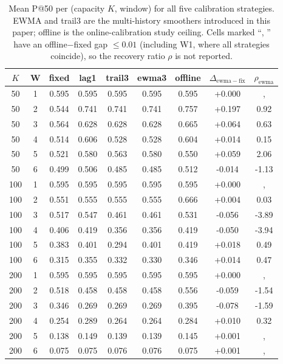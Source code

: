 \begin{table}[!t]
 \caption{Mean P@50 per (capacity $K$, window) for all five calibration strategies. EWMA and trail3 are the multi-history smoothers introduced in this paper; offline is the online-calibration study ceiling. Cells marked ``, '' have an offline$-$fixed gap $\leq 0.01$ (including W1, where all strategies coincide), so the recovery ratio $\rho$ is not reported.}
 \label{tab:main}
 \centering
 \small
 \setlength{\tabcolsep}{5pt}
 \begin{tabular}{cc ccccc cc}
 \toprule
 $K$ & W & fixed & lag1 & trail3 & ewma3 & offline & $\Delta_{\mathrm{ewma\!-\!fix}}$ & $\rho_{\mathrm{ewma}}$ \\
 \midrule
 50 & 1 & 0.595 & 0.595 & 0.595 & 0.595 & 0.595 & +0.000 &, \\
 50 & 2 & 0.544 & 0.741 & 0.741 & 0.741 & 0.757 & +0.197 & 0.92 \\
 50 & 3 & 0.564 & 0.628 & 0.628 & 0.628 & 0.665 & +0.064 & 0.63 \\
 50 & 4 & 0.514 & 0.606 & 0.528 & 0.528 & 0.604 & +0.014 & 0.15 \\
 50 & 5 & 0.521 & 0.580 & 0.563 & 0.580 & 0.550 & +0.059 & 2.06 \\
 50 & 6 & 0.499 & 0.506 & 0.485 & 0.485 & 0.512 & -0.014 & -1.13 \\
 \midrule
 100 & 1 & 0.595 & 0.595 & 0.595 & 0.595 & 0.595 & +0.000 &, \\
 100 & 2 & 0.551 & 0.555 & 0.555 & 0.555 & 0.666 & +0.004 & 0.03 \\
 100 & 3 & 0.517 & 0.547 & 0.461 & 0.461 & 0.531 & -0.056 & -3.89 \\
 100 & 4 & 0.406 & 0.419 & 0.356 & 0.356 & 0.419 & -0.050 & -3.94 \\
 100 & 5 & 0.383 & 0.401 & 0.294 & 0.401 & 0.419 & +0.018 & 0.49 \\
 100 & 6 & 0.315 & 0.355 & 0.332 & 0.330 & 0.346 & +0.014 & 0.47 \\
 \midrule
 200 & 1 & 0.595 & 0.595 & 0.595 & 0.595 & 0.595 & +0.000 &, \\
 200 & 2 & 0.518 & 0.458 & 0.458 & 0.458 & 0.556 & -0.059 & -1.54 \\
 200 & 3 & 0.346 & 0.269 & 0.269 & 0.269 & 0.395 & -0.078 & -1.59 \\
 200 & 4 & 0.254 & 0.289 & 0.264 & 0.264 & 0.284 & +0.010 & 0.32 \\
 200 & 5 & 0.138 & 0.149 & 0.139 & 0.139 & 0.145 & +0.001 &, \\
 200 & 6 & 0.075 & 0.075 & 0.076 & 0.076 & 0.075 & +0.001 &, \\
 \bottomrule
 \end{tabular}
\end{table}
